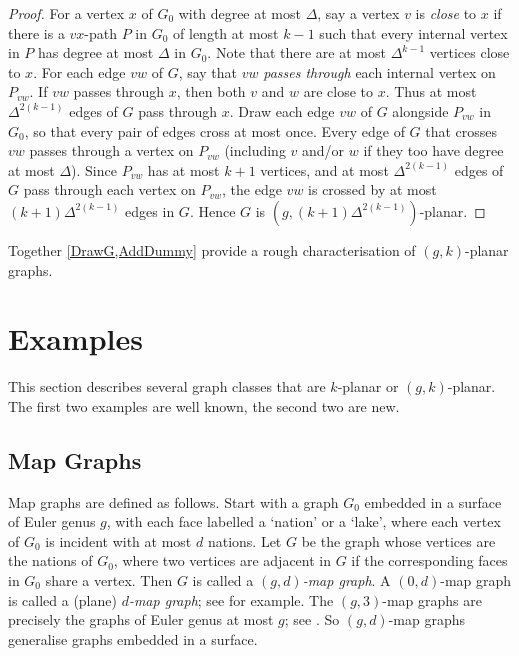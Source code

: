 \documentclass{patmorin}
\begin{document}
\begin{proof}
For a vertex $x$ of $G_0$ with degree at most $\Delta$, say a vertex $v$ is \emph{close} to $x$ if there is a $vx$-path $P$ in $G_0$ of length at most $k-1$ such that every internal vertex in $P$  has degree at most $\Delta$ in $G_0$. Note that there are at most $\Delta^{k-1}$ vertices close to $x$. 
For each edge $vw$ of $G$, say that $vw$ \emph{passes through} each internal vertex on $P_{vw}$. 
If $vw$ passes through $x$, then both $v$ and $w$ are close to $x$. 
Thus at most $\Delta^{2(k-1)}$ edges of $G$ pass through $x$. 
Draw each edge $vw$ of $G$ alongside $P_{vw}$ in $G_0$, so that every pair of edges cross at most once. 
Every edge of $G$ that crosses $vw$ passes through a vertex on $P_{vw}$ (including $v$ and/or $w$ if they too have degree at most $\Delta$). 
Since $P_{vw}$ has at most $k+1$ vertices, and at most $\Delta^{2(k-1)}$ edges of $G$ pass through each vertex on $P_{vw}$, 
the edge $vw$ is crossed by at most $(k+1)\Delta^{2(k-1)}$ edges in $G$. 
Hence $G$ is $(g, (k+1)\Delta^{2(k-1)} )$-planar.
\end{proof}

Together \cref{DrawG,AddDummy} provide a rough characterisation of $(g,k)$-planar graphs. 

\section{Examples}
\label{Examples}

This section describes several graph classes that are $k$-planar or $(g,k)$-planar. The first two examples are well known, the second two are new. 


\subsection{Map Graphs}

Map graphs are defined as follows. Start with a graph $G_0$ embedded in a surface of Euler genus $g$, with each face labelled a `nation' or a `lake', where each vertex of $G_0$ is incident with at most $d$ nations. Let $G$ be the graph whose vertices are the nations of $G_0$, where two vertices are adjacent in $G$ if the corresponding faces in $G_0$ share a vertex. Then $G$ is called a \emph{$(g,d)$-map graph}.  A $(0,d)$-map graph is called a (plane) \emph{$d$-map graph}; see \citep{FLS-SODA12,CGP02} for example. 
The $(g,3)$-map graphs are precisely the graphs of Euler genus at most $g$; see \citep{dujmovic.eppstein.ea:structure}. So $(g,d)$-map graphs generalise graphs embedded in a surface. 
\end{document}
